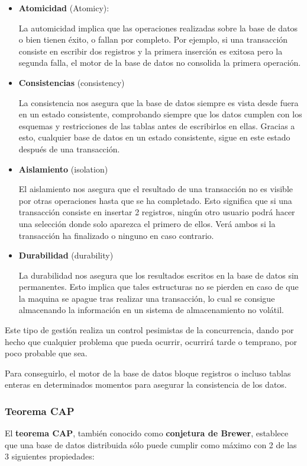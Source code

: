 \begin{itemize}
	\item \textbf{Atomicidad} (Atomicy):
	
	La automicidad implica que las operaciones realizadas sobre la base de datos o bien tienen éxito, o fallan por completo. Por ejemplo, si una transacción consiste en escribir dos registros y la primera inserción es exitosa pero la segunda falla, el motor de la base de datos no consolida la primera operación.
	
	\item \textbf{Consistencias} (consistency)
	
	La consistencia nos asegura que la base de datos siempre es vista desde fuera en un estado consistente, comprobando siempre que los datos cumplen con los esquemas y restricciones de las tablas antes de escribirlos en ellas. Gracias a esto, cualquier base de datos en un estado consistente, sigue en este estado después de una transacción. 
	
	\item \textbf{Aislamiento} (isolation)
	
	El aislamiento nos asegura que el resultado de una transacción no es visible por otras operaciones hasta que se ha completado. Esto significa que si una transacción consiste en insertar 2 registros, ningún otro usuario podrá hacer una selección donde solo aparezca el primero de ellos. Verá ambos si la transacción ha finalizado o ninguno en caso contrario.
	
	\item \textbf{Durabilidad} (durability)
	
	La durabilidad nos asegura que los resultados escritos en la base de datos sin permanentes. Esto implica que tales estructuras no se pierden en caso de que la maquina se apague tras realizar una transacción, lo cual se consigue almacenando la información en un sistema de almacenamiento no volátil.
\end{itemize} 

Este tipo de gestión realiza un control pesimistas de la \gls{concurrencia}, dando por hecho que cualquier problema que pueda ocurrir, ocurrirá tarde o temprano, por poco probable que sea.

Para conseguirlo, el motor de la base de datos bloque registros o incluso tablas enteras en determinados momentos para asegurar la consistencia de los datos. 

\subsubsection{Teorema CAP}
El \textbf{teorema CAP}, también conocido como \textbf{conjetura de Brewer}, establece que una base de datos distribuida sólo puede cumplir como máximo con 2 de las 3 siguientes propiedades:

